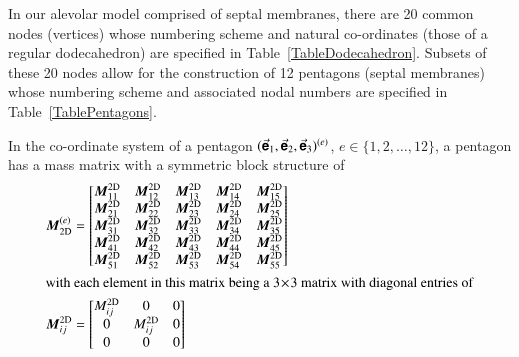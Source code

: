 In our alevolar model comprised of septal membranes, there are 20 common nodes (vertices) whose numbering scheme and natural co-ordinates (those of a regular dodecahedron) are specified in Table~\ref{TableDodecahedron}.  Subsets of these 20 nodes allow for the construction of 12 pentagons (septal membranes) whose numbering scheme and associated nodal numbers are specified in Table~\ref{TablePentagons}.

In the co-ordinate system of a pentagon $( \vec{\boldsymbol{\mathsf{e}}}_1 , \vec{\boldsymbol{\mathsf{e}}}_2 , \vec{\boldsymbol{\mathsf{e}}}_3  )^{(e)}$, $e \in \{ 1, 2, \ldots, 12 \}$, a pentagon has a mass matrix with a symmetric block structure of
\begin{subequations}
    \begin{align}
    \boldsymbol{M}^{(e)}_{\mathrm{2D}} & = 
    \begin{bmatrix}
    \boldsymbol{M}^{\mathrm{2D}}_{11} & \boldsymbol{M}^{\mathrm{2D}}_{12} & 
    \boldsymbol{M}^{\mathrm{2D}}_{13} & \boldsymbol{M}^{\mathrm{2D}}_{14} & 
    \boldsymbol{M}^{\mathrm{2D}}_{15} \\
    \boldsymbol{M}^{\mathrm{2D}}_{21} & \boldsymbol{M}^{\mathrm{2D}}_{22} & 
    \boldsymbol{M}^{\mathrm{2D}}_{23} & \boldsymbol{M}^{\mathrm{2D}}_{24} & 
    \boldsymbol{M}^{\mathrm{2D}}_{25} \\
    \boldsymbol{M}^{\mathrm{2D}}_{31} & \boldsymbol{M}^{\mathrm{2D}}_{32} & 
    \boldsymbol{M}^{\mathrm{2D}}_{33} & \boldsymbol{M}^{\mathrm{2D}}_{34} & 
    \boldsymbol{M}^{\mathrm{2D}}_{35} \\
    \boldsymbol{M}^{\mathrm{2D}}_{41} & \boldsymbol{M}^{\mathrm{2D}}_{42} & 
    \boldsymbol{M}^{\mathrm{2D}}_{43} & \boldsymbol{M}^{\mathrm{2D}}_{44} & 
    \boldsymbol{M}^{\mathrm{2D}}_{45} \\ 
    \boldsymbol{M}^{\mathrm{2D}}_{51} & \boldsymbol{M}^{\mathrm{2D}}_{52} & 
    \boldsymbol{M}^{\mathrm{2D}}_{53} & \boldsymbol{M}^{\mathrm{2D}}_{54} & 
    \boldsymbol{M}^{\mathrm{2D}}_{55}
    \end{bmatrix} \\
    \intertext{with each element in this matrix being a $3 \! \times \! 3$ matrix with diagonal entries of}
    \boldsymbol{M}^{\mathrm{2D}}_{ij} & = 
    \begin{bmatrix}
    M^{\mathrm{2D}}_{ij} & 0 & 0 \\
    0 & M^{\mathrm{2D}}_{ij} & 0 \\
    0 & 0 & 0
    \end{bmatrix}
    \end{align}
\end{subequations}
